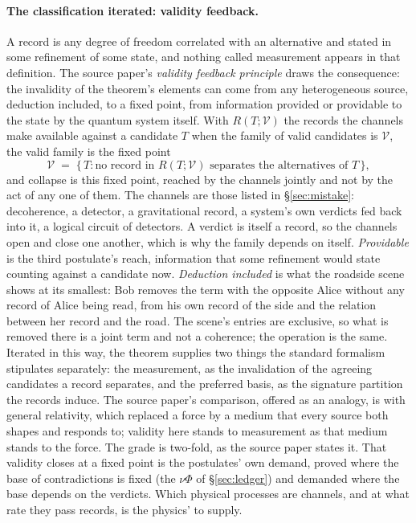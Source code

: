 \paragraph{The classification iterated: validity feedback.} A record is any degree of freedom correlated with an alternative and stated in some refinement of some state, and nothing called measurement appears in that definition. The source paper's \emph{validity feedback principle} draws the consequence: the invalidity of the theorem's elements can come from any heterogeneous source, deduction included, to a fixed point, from information provided or providable to the state by the quantum system itself. With $R(T; \mathcal{V})$ the records the channels make available against a candidate $T$ when the family of valid candidates is $\mathcal{V}$, the valid family is the fixed point
\[
\mathcal{V} \;=\; \{\, T : \text{no record in } R(T; \mathcal{V}) \text{ separates the alternatives of } T \,\},
\]
and collapse is this fixed point, reached by the channels jointly and not by the act of any one of them. The channels are those listed in \S\ref{sec:mistake}: decoherence, a detector, a gravitational record, a system's own verdicts fed back into it, a logical circuit of detectors. A verdict is itself a record, so the channels open and close one another, which is why the family depends on itself. \emph{Providable} is the third postulate's reach, information that some refinement would state counting against a candidate now. \emph{Deduction included} is what the roadside scene shows at its smallest: Bob removes the term with the opposite Alice without any record of Alice being read, from his own record of the side and the relation between her record and the road. The scene's entries are exclusive, so what is removed there is a joint term and not a coherence; the operation is the same. Iterated in this way, the theorem supplies two things the standard formalism stipulates separately: the measurement, as the invalidation of the agreeing candidates a record separates, and the preferred basis, as the signature partition the records induce. The source paper's comparison, offered as an analogy, is with general relativity, which replaced a force by a medium that every source both shapes and responds to; validity here stands to measurement as that medium stands to the force. The grade is two-fold, as the source paper states it. That validity closes at a fixed point is the postulates' own demand, proved where the base of contradictions is fixed (the $\nu\Phi$ of \S\ref{sec:ledger}) and demanded where the base depends on the verdicts. Which physical processes are channels, and at what rate they pass records, is the physics' to supply.


